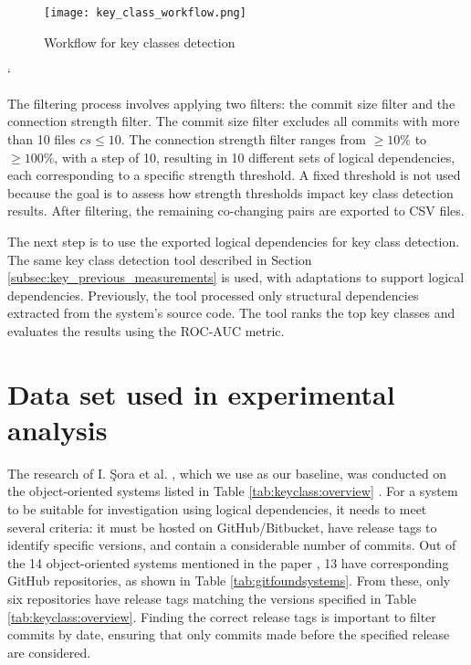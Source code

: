 \begin{figure}[H]
\centering
\texttt{[image: key\_class\_workflow.png]}
\caption{Workflow for key classes detection}
\label{fig:workflow_key}
\centering
\end{figure}`


The filtering process involves applying two filters: the commit size filter and the connection strength filter. The commit size filter excludes all commits with more than 10 files \(cs \leq 10\). The connection strength filter ranges from \( \geq 10\% \) to \( \geq 100\% \), with a step of 10, resulting in 10 different sets of logical dependencies, each corresponding to a specific strength threshold. A fixed threshold is not used because the goal is to assess how strength thresholds impact key class detection results. After filtering, the remaining co-changing pairs are exported to CSV files.

The next step is to use the exported logical dependencies for key class detection. The same key class detection tool described in Section \ref{subsec:key_previous_measurements} is used, with adaptations to support logical dependencies. Previously, the tool processed only structural dependencies extracted from the system's source code. The tool ranks the top key classes and evaluates the results using the ROC-AUC metric.





\section{Data set used in experimental analysis}
\label{sec:key_dataset}


\hspace{4em}The research of I. Şora et al. \cite{Finding-key-classes}, which we use as our baseline, was conducted on the object-oriented systems listed in Table \ref{tab:keyclass:overview} \cite{b4}. For a system to be suitable for investigation using logical dependencies, it needs to meet several criteria: it must be hosted on GitHub/Bitbucket, have release tags to identify specific versions, and contain a considerable number of commits. Out of the 14 object-oriented systems mentioned in the paper \cite{Finding-key-classes}, 13 have corresponding GitHub repositories, as shown in Table \ref{tab:gitfoundsystems}. From these, only six repositories have release tags matching the versions specified in Table \ref{tab:keyclass:overview}. Finding the correct release tags is important to filter commits by date, ensuring that only commits made before the specified release are considered.

